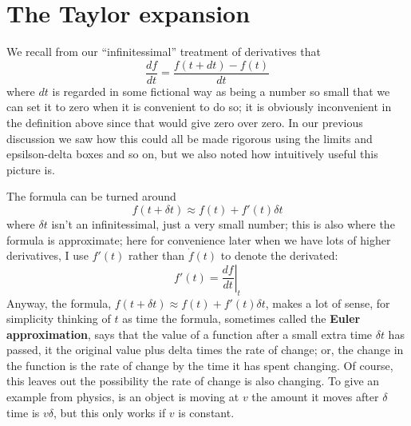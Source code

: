 \documentclass[12pt]{article}
\begin{document}
\section*{The Taylor expansion}

We recall from our ``infinitessimal'' treatment of derivatives that
\begin{equation}
  \frac{df}{dt}=\frac{f(t+dt)-f(t)}{dt}
\end{equation}
where $dt$ is regarded in some fictional way as being a number so
small that we can set it to zero when it is convenient to do so; it is
obviously inconvenient in the definition above since that would give
zero over zero. In our previous discussion we saw how this could all
be made rigorous using the limits and epsilson-delta boxes and so on,
but we also noted how intuitively useful this picture is.

The formula can be turned around
\begin{equation}
  f(t+\delta t)\approx f(t)+f'(t)\delta t
\end{equation}
where $\delta t$ isn't an infinitessimal, just a very small number; this
is also where the formula is approximate; here for convenience later when we have lots of higher derivatives, I use $f'(t)$ rather than $\dot{f}(t)$ to denote the derivated:
\begin{equation}
  f'(t)=\left.\frac{df}{dt}\right|_t
\end{equation}
Anyway, the formula, $f(t+\delta t)\approx f(t)+f'(t)\delta t$, makes a
lot of sense, for simplicity thinking of $t$ as time the formula,
sometimes called the \textbf{Euler approximation}, says that the value
of a function after a small extra time $\delta t$ has passed, it the original value plus
delta times the rate of change; or, the change in the function is the
rate of change by the time it has spent changing. Of course, this
leaves out the possibility the rate of change is also changing. To
give an example from physics, is an object is moving at $v$ the amount
it moves after $\delta$ time is $v\delta$, but this only works if $v$
is constant.
\end{document}
